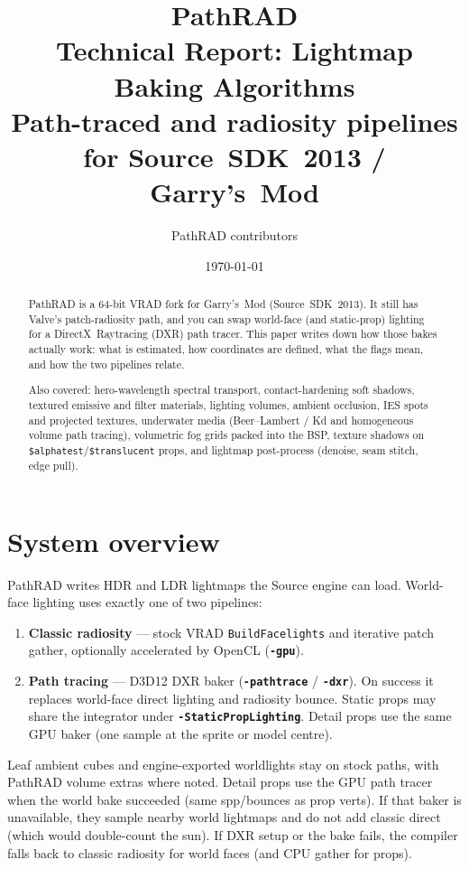 \documentclass[11pt,a4paper]{article}
\title{%
  \vspace{-1.2em}
  {\color{cvBlue}\Huge\bfseries PathRAD}\\[0.35em]
  {\Large Technical Report: Lightmap Baking Algorithms}\\[0.5em]
  {\normalsize\color{cvMuted} Path-traced and radiosity pipelines for Source~SDK~2013 / Garry's~Mod}
}
\author{PathRAD contributors}
\date{\today}
\newcommand{\flag}[1]{\texttt{\bfseries #1}}
\newcommand{\vmt}[1]{\texttt{\$#1}}
\newcommand{\code}[1]{\texttt{#1}}
\begin{document}
\maketitle
\begin{abstract}
\noindent
PathRAD is a 64-bit VRAD fork for Garry's~Mod (Source~SDK~2013).
It still has Valve's patch-radiosity path, and you can swap world-face
(and static-prop) lighting for a DirectX~Raytracing (DXR) path tracer.
This paper writes down how those bakes actually work: what is estimated,
how coordinates are defined, what the flags mean, and how the two pipelines
relate.

Also covered: hero-wavelength spectral transport, contact-hardening soft
shadows, textured emissive and filter materials, lighting volumes, ambient
occlusion, IES spots and projected textures, underwater media
(Beer--Lambert / Kd and homogeneous volume path tracing), volumetric fog
grids packed into the BSP, texture shadows on \vmt{alphatest}/\vmt{translucent}
props, and lightmap post-process (denoise, seam stitch, edge pull).
\end{abstract}

\tableofcontents
\newpage

\section{System overview}

PathRAD writes HDR and LDR lightmaps the Source engine can load.
World-face lighting uses exactly one of two pipelines:

\begin{enumerate}[leftmargin=1.6em]
  \item \textbf{Classic radiosity} --- stock VRAD \code{BuildFacelights} and
        iterative patch gather, optionally accelerated by OpenCL (\flag{-gpu}).
  \item \textbf{Path tracing} --- D3D12 DXR baker (\flag{-pathtrace} /
        \flag{-dxr}). On success it replaces world-face direct lighting and
        radiosity bounce. Static props may share the integrator under
        \flag{-StaticPropLighting}. Detail props use the same GPU baker
        (one sample at the sprite or model centre).
\end{enumerate}

Leaf ambient cubes and engine-exported worldlights stay on
stock paths, with PathRAD volume extras where noted.
Detail props use the GPU path tracer when the world bake succeeded
(same spp/bounces as prop verts). If that baker is unavailable, they
sample nearby world lightmaps and do not add classic direct (which
would double-count the sun).
If DXR setup or the bake fails, the compiler falls back to classic
radiosity for world faces (and CPU gather for props).
\end{document}
